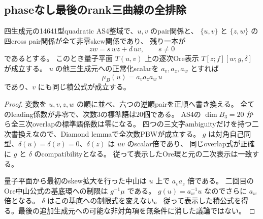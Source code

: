 \subsection{phaseなし最後のrank三曲線の全排除}
\label{subsec:cubic-four-simple-last-rank3-curve}
\begin{lemma}[二正常基底上の一つの二次Ore変形]
\label{lem:cubic-two-normal-base-Ore-scalar}
四生成元の14641型quadratic AS4整域で、$u,v$ のpair関係と、
$\{u,v\}$ と $\{z,w\}$ の四cross pair関係が全て非零skew関係であり、
残り一本が
\[
 zw=s\,wz+d\,uv,\qquad s\ne0
\]
であるとする。
このとき量子平面 $T(u,v)$ 上の逐次Ore表示
$T[z;f][w;g,\delta]$ が成立する。
$u$ の他三生成元への正常化scalarを $a_v,a_z,a_w$ とすれば
\[
 \mu_B(u)=a_va_za_w\,u
\]
であり、$v$ にも同じ積公式が成立する。
\end{lemma}
\begin{proof}
変数を $u,v,z,w$ の順に並べ、六つの逆順pairを正順へ書き換える。
全てのleading係数が非零で、次数3の標準語は20個である。
AS4の $\dim B_3=20$ から全三次overlapの標準語係数は零になる。
四つの三文字ambiguityだけを持つ二次書換えなので、Diamond lemmaで全次数PBWが成立する。
$g$ は対角自己同型、$\delta(u)=\delta(v)=0$、$\delta(z)$ は $uv$ のscalar倍であり、
同じoverlap式が正確に $g$ と $\delta$ のcompatibilityとなる。
従って表示したOre環と元の二次表示は一致する。

量子平面から最初のskew拡大を行った中山は $u$ 上で $a_va_z$ 倍である。
二回目のOre中山公式の基底環への制限は $g^{-1}\mu$ である。
$g(u)=a_w^{-1}u$ なのでさらに $a_w$ 倍となる。
$\delta$ はこの基底への制限式を変えない。
従って表示した積公式を得る。最後の追加生成元への可能な非対角項を無条件に消した議論ではない。
\end{proof}

